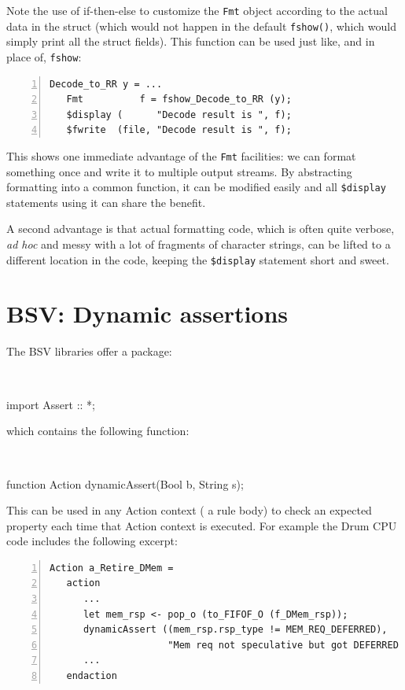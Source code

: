 

Note the use of if-then-else to customize the \verb|Fmt| object
according to the actual data in the struct (which would not happen in
the default \verb|fshow()|, which would simply print all the struct
fields).  This function can be used just like, and in place of,
\verb|fshow|:

{\small
\begin{Verbatim}[frame=single, numbers=left]
   Decode_to_RR y = ...
   Fmt          f = fshow_Decode_to_RR (y);
   $display (      "Decode result is ", f);
   $fwrite  (file, "Decode result is ", f);
\end{Verbatim}
}

This shows one immediate advantage of the \verb|Fmt| facilities: we
can format something once and write it to multiple output streams.  By
abstracting formatting into a common function, it can be modified
easily and all \verb|$display| statements using it can share the
benefit.

A second advantage is that actual formatting code, which is often
quite verbose, \emph{ad hoc} and messy with a lot of fragments of
character strings, can be lifted to a different location in the code,
keeping the \verb|$display| statement short and sweet.


\section{BSV: Dynamic assertions}


The BSV libraries offer a package:

{\tt
\begin{tabbing}
\hmmm import Assert :: *;
\end{tabbing}
}

which contains the following function:

{\tt
\begin{tabbing}
\hmmm function Action dynamicAssert(Bool b, String s);
\end{tabbing}
}

This can be used in any Action context ({\eg} a rule body) to check an
expected property each time that Action context is executed.  For
example the Drum CPU code includes the following excerpt:

{\small
\begin{Verbatim}[frame=single, numbers=left, label=src\_Drum/CPU.bsv]
   Action a_Retire_DMem =
   action
      ...
      let mem_rsp <- pop_o (to_FIFOF_O (f_DMem_rsp));
      dynamicAssert ((mem_rsp.rsp_type != MEM_REQ_DEFERRED),
                     "Mem req not speculative but got DEFERRED mem response");
      ...
   endaction
\end{Verbatim}
}

